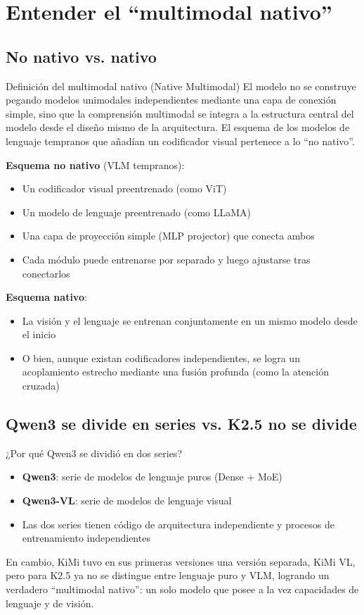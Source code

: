 \section{Entender el ``multimodal nativo''}

\subsection{No nativo vs. nativo}

\begin{importantbox}{Definición del multimodal nativo (Native Multimodal)}
El modelo no se construye pegando modelos unimodales independientes mediante una capa de conexión simple, sino que la comprensión multimodal se integra a la estructura central del modelo desde el diseño mismo de la arquitectura. El esquema de los modelos de lenguaje tempranos que añadían un codificador visual pertenece a lo ``no nativo''.
\end{importantbox}

\textbf{Esquema no nativo} (VLM tempranos):
\begin{itemize}
  \item Un codificador visual preentrenado (como ViT)
  \item Un modelo de lenguaje preentrenado (como LLaMA)
  \item Una capa de proyección simple (MLP projector) que conecta ambos
  \item Cada módulo puede entrenarse por separado y luego ajustarse tras conectarlos
\end{itemize}

\textbf{Esquema nativo}:
\begin{itemize}
  \item La visión y el lenguaje se entrenan conjuntamente en un mismo modelo desde el inicio
  \item O bien, aunque existan codificadores independientes, se logra un acoplamiento estrecho mediante una fusión profunda (como la atención cruzada)
\end{itemize}

\subsection{Qwen3 se divide en series vs. K2.5 no se divide}

\begin{knowledgebox}{¿Por qué Qwen3 se dividió en dos series?}
\begin{itemize}
  \item \textbf{Qwen3}: serie de modelos de lenguaje puros (Dense + MoE)
  \item \textbf{Qwen3-VL}: serie de modelos de lenguaje visual
  \item Las dos series tienen código de arquitectura independiente y procesos de entrenamiento independientes
\end{itemize}
En cambio, KiMi tuvo en sus primeras versiones una versión separada, KiMi VL, pero para K2.5 ya no se distingue entre lenguaje puro y VLM, logrando un verdadero ``multimodal nativo'': un solo modelo que posee a la vez capacidades de lenguaje y de visión.
\end{knowledgebox}

